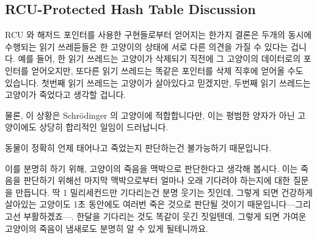 \subsection{RCU-Protected Hash Table Discussion}
\label{sec:datastruct:RCU-Protected Hash Table Discussion}

RCU 와 해저드 포인터를 사용한 구현들로부터 얻어지는 한가지 결론은 두개의 동시에
수행되는 읽기 쓰레듣들은 한 고양이의 상태에 서로 다른 의견을 가질 수 있다는
겁니다.
예를 들어, 한 읽기 쓰레드는 고양이가 삭제되기 직전에 그 고양이의 데이터로의
포인터를 얻어오지만, 또다른 읽기 쓰레드는 똑같은 포인터를 삭제 직후에 얻어올
수도 있습니다.
첫번째 읽기 쓰레드는 고양이가 살아있다고 믿겠지만, 두번째 읽기 쓰레드는
고양이가 죽었다고 생각할 겁니다.

물론, 이 상황은 Schr\"odinger 의 고양이에 적합합니다만, 이는 평범한 양자가 아닌
고양이에도 상당히 합리적인 일임이 드러납니다.

동물이 정확히 언제 태어나고 죽었는지 판단하는건 불가능하기 때문입니다.

이를 분명히 하기 위해, 고양이의 죽음을 맥박으로 판단한다고 생각해 봅시다.
이는 죽음을 판단하기 위해선 마지막 맥박으로부터 얼마나 오래 기다려야 하는지에
대한 질문을 만듭니다.
딱 1 밀리세컨드만 기다리는건 분명 웃기는 짓인데, 그렇게 되면 건강하게 살아있는
고양이도 1초 동안에도 여러번 죽은 것으로 판단될 것이기 때문입니다---그리고선
부활하겠죠---.
한달을 기다리는 것도 똑같이 웃긴 짓일텐데, 그렇게 되면 가여운 고양이의 죽음이
냄새로도 분명히 알 수 있게 될테니까요.

